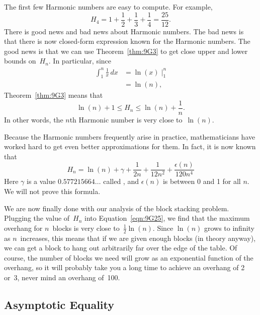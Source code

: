 The first few Harmonic numbers are easy to compute.  For example,
\begin{equation*}
    H_4 = 1 + \frac{1}{2} + \frac{1}{3} + \frac{1}{4} = \frac{25}{12}.
\end{equation*}
There is good news and bad news about Harmonic numbers.  The bad news
is that there is now closed-form expression known for the Harmonic
numbers.  The good news is that we can use Theorem~\ref{thm:9G3} to
get close upper and lower bounds on~$H_n$.  In particular, since
\begin{align*}
\int_1^n \frac{1}{x} \, dx
    &= \left. \ln(x) \; \right|_1^n \\
    &= \ln(n),
\end{align*}
Theorem~\ref{thm:9G3} means that
\begin{equation}\label{eqn:9G30}
    \ln(n) + 1 \le H_n \le \ln(n) + \frac{1}{n}.
\end{equation}
In other words, the $n$th Harmonic number is very close to~$\ln(n)$.

Because the Harmonic numbers frequently arise in practice,
mathematicians have worked hard to get even better approximations for
them.  In fact, it is now known that
\begin{equation}\label{eqn:9K2}
    H_n = \ln(n) + \gamma + \frac{1}{2n} + \frac{1}{12n^2} +
        \frac{\epsilon(n)}{120n^4}
\end{equation}
Here $\gamma$ is a value $0.577215664\dots$ called , and $\epsilon(n)$ is between 0 and 1 for all $n$.  We
will not prove this formula.

We are now finally done with our analysis of the block stacking
problem.  Plugging the value of~$H_n$ into Equation~\ref{eqn:9G25}, we
find that the maximum overhang for $n$~blocks is very close
to~$\frac{1}{2} \ln(n)$.  Since $\ln(n)$ grows to infinity as
$n$~increases, this means that if we are given enough blocks (in theory anyway), we
can get a block to hang out arbitrarily far over the edge of the
table.  Of course, the number of blocks we need will grow as an
exponential function of the overhang, so it will probably take you a
long time to achieve an overhang of 2 or~3, never mind an overhang
of~100.

\subsection{Asymptotic Equality}\label{sec:asymptotic_equality}

